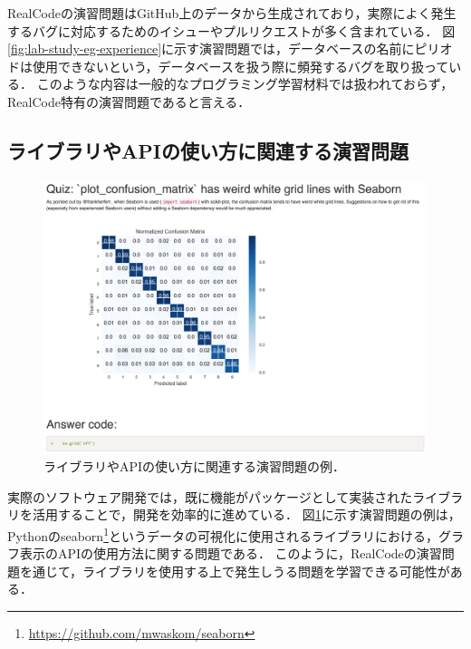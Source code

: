 RealCodeの演習問題はGitHub上のデータから生成されており，実際によく発生するバグに対応するためのイシューやプルリクエストが多く含まれている．
図\ref{fig:lab-study-eg-experience}に示す演習問題では，データベースの名前にピリオドは使用できないという，データベースを扱う際に頻発するバグを取り扱っている．
このような内容は一般的なプログラミング学習材料では扱われておらず，RealCode特有の演習問題であると言える．


\subsection{ライブラリやAPIの使い方に関連する演習問題}

\begin{figure}[t]
	\centering
  \includegraphics[width=1.0\columnwidth]{20190107-lab-study-lib-exercise.png}
  \caption{ライブラリやAPIの使い方に関連する演習問題の例．}
  \label{fig:lab-study-eg-lib}
\end{figure}

実際のソフトウェア開発では，既に機能がパッケージとして実装されたライブラリを活用することで，開発を効率的に進めている．
図\ref{fig:lab-study-eg-lib}に示す演習問題の例は，Pythonのseaborn\footnote{\url{https://github.com/mwaskom/seaborn}}というデータの可視化に使用されるライブラリにおける，グラフ表示のAPIの使用方法に関する問題である．
このように，RealCodeの演習問題を通じて，ライブラリを使用する上で発生しうる問題を学習できる可能性がある．
